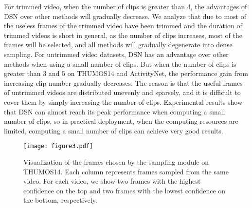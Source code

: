 \documentclass[journal]{IEEEtran}
\begin{document}
For trimmed video, when the number of clips is greater than 4, the advantages of DSN over other methods will gradually decrease.
We analyze that due to most of the useless frames of the trimmed video have been trimmed and the duration of trimmed videos is short in general, as the number of clips increases,  most of the frames will be selected, and all methods will gradually degenerate into dense sampling.
For untrimmed video datasets, DSN has an advantage over other methods when using a small number of clips.
But when the number of clips is greater than 3 and 5 on THUMOS14 and ActivityNet, the performance gain from increasing clip number gradually decreases.
The reason is that the useful frames of untrimmed videos are distributed unevenly and sparsely, and it is difficult to cover them by simply increasing the number of clips.
Experimental results show that DSN can almost reach its peak performance when computing a small number of clips, so in practical deployment, when the computing resources are limited, computing a small number of clips can achieve very good results.




\begin{figure*}[t]
  \centering
  \texttt{[image: figure3.pdf]}
  \caption{Visualization of the frames chosen by the sampling module on THUMOS14. Each column represents frames sampled from the same video. For each video, we show two frames with the highest confidence on the top and two frames with the lowest confidence on the bottom, respectively.}
  \label{fig:visualization}
  \vspace{-2mm}
\end{figure*}
\end{document}
